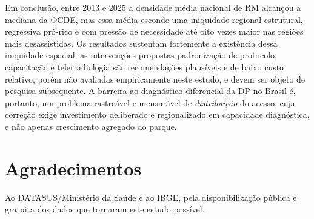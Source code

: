 \documentclass[12pt,a4paper,oneside]{article}
\begin{document}
Em conclusão, entre 2013 e 2025 a densidade média nacional de RM
alcançou a mediana da OCDE, mas essa média esconde uma iniquidade
regional estrutural, regressiva pró-rico e com pressão de necessidade
até oito vezes maior nas regiões mais desassistidas. Os resultados
sustentam fortemente a existência dessa iniquidade espacial; as
intervenções propostas \textemdash{} padronização de protocolo,
capacitação e telerradiologia \textemdash{} são recomendações
plausíveis e de baixo custo relativo, porém não avaliadas
empiricamente neste estudo, e devem ser objeto de pesquisa subsequente.
A barreira ao diagnóstico diferencial da DP no Brasil é, portanto, um
problema rastreável e mensurável de \textit{distribuição} do acesso,
cuja correção exige investimento deliberado e regionalizado em
capacidade diagnóstica, e não apenas crescimento agregado do parque.

\section*{Agradecimentos}

Ao DATASUS/Ministério da Saúde e ao IBGE, pela disponibilização
pública e gratuita dos dados que tornaram este estudo possível.

\end{document}
